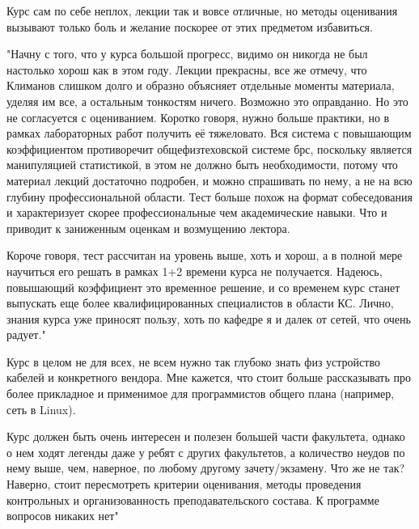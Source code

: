         \begin{commentbox}
			Курс сам по себе неплох, лекции так и вовсе отличные, но методы оценивания вызывают только боль и желание поскорее от этих предметом избавиться. 
		\end{commentbox}

        \begin{commentbox}
			"Начну с того, что у курса большой прогресс, видимо он никогда не был настолько хорош как в этом году. Лекции прекрасны, все же отмечу, что Климанов слишком долго и образно объясняет отдельные моменты материала, уделяя им все, а остальным тонкостям ничего. Возможно это оправданно. Но это не согласуется с оцениванием. Коротко говоря, нужно больше практики, но в рамках лабораторных работ получить её тяжеловато. Вся система с повышающим коэффициентом противоречит общефизтеховской системе брс, поскольку является манипуляцией статистикой, в этом не должно быть необходимости, потому что материал лекций достаточно подробен, и можно спрашивать по нему, а не на всю глубину профессиональной области. Тест больше похож на формат собеседования и характеризует скорее профессиональные чем академические навыки. Что и приводит к заниженным оценкам и возмущению лектора.

            Короче говоря, тест рассчитан на уровень выше, хоть и хорош, а в полной мере научиться его решать в рамках 1+2 времени курса не получается. Надеюсь, повышающий коэффициент это временное решение, и со временем курс станет выпускать еще более квалифицированных специалистов в области КС. Лично, знания курса уже приносят пользу, хоть по кафедре я и далек от сетей, что очень радует."
		\end{commentbox}

        \begin{commentbox}
			Курс в целом не для всех, не всем нужно так глубоко знать физ устройство кабелей и конкретного вендора. Мне кажется, что стоит больше рассказывать про более прикладное и применимое для программистов общего плана (например, сеть в Linux). 
		\end{commentbox}

        \begin{commentbox}
			Курс должен быть очень интересен и полезен большей части факультета, однако о нем ходят легенды даже у ребят с других факультетов, а количество неудов по нему выше, чем, наверное, по любому другому зачету/экзамену.
            Что же не так? Наверно, стоит пересмотреть критерии оценивания, методы проведения контрольных и организованность преподавательского состава. К программе вопросов никаких нет"
		\end{commentbox}

